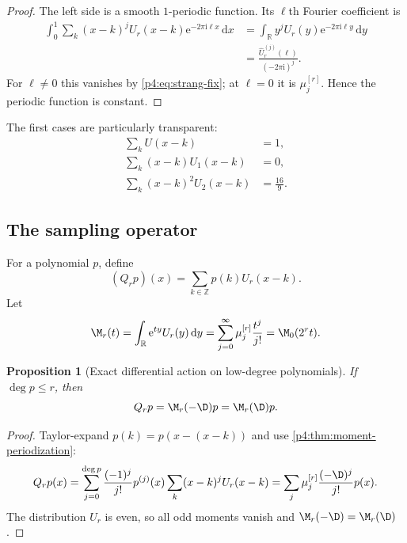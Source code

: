 \documentclass[11pt]{article}
\numberwithin{equation}{section}
\newtheorem{proposition}[theorem]{Proposition}
\theoremstyle{definition}
\theoremstyle{remark}
\newcommand{\R}{\mathbb R}
\newcommand{\Z}{\mathbb Z}
\newcommand{\dd}{\,\mathrm d}
\newcommand{\e}{\mathrm e}
\newcommand{\ii}{\mathrm i}
\begin{document}
\begin{proof}
The left side is a smooth $1$-periodic function.  Its $\ell$th Fourier coefficient is
\begin{align*}
 \int_0^1\sum_k(x-k)^jU_r(x-k)\e^{-2\pi\ii\ell x}\dd x
 &=\int_{\R}y^jU_r(y)\e^{-2\pi\ii\ell y}\dd y\\
 &=\frac{\widehat U_r^{(j)}(\ell)}{(-2\pi\ii)^j}.
\end{align*}
For $\ell\ne0$ this vanishes by \eqref{p4:eq:strang-fix}; at $\ell=0$ it is $\mu_j^{[r]}$.  Hence the periodic function is constant.
\end{proof}

The first cases are particularly transparent:
\begin{align}
 \sum_kU(x-k)&=1,
 \label{p4:eq:partition-unity}\\
 \sum_k(x-k)U_1(x-k)&=0,
 \label{p4:eq:first-moment-periodization}\\
 \sum_k(x-k)^2U_2(x-k)&=\frac{16}{9}.
 \label{p4:eq:second-moment-periodization}
\end{align}

\subsection{The sampling operator}
For a polynomial $p$, define
\begin{equation}
 (Q_rp)(x)=\sum_{k\in\Z}p(k)U_r(x-k).
 \label{p4:eq:sampling-operator}
\end{equation}
Let
\begin{equation}
 \M_r(t)=\int_{\R}\e^{ty}U_r(y)\dd y
 =\sum_{j=0}^{\infty}\mu_j^{[r]}\frac{t^j}{j!}
 =\M_0(2^rt).
 \label{p4:eq:Mr}
\end{equation}

\begin{proposition}[Exact differential action on low-degree polynomials]
\label{p4:prop:Qr-action}
If $\deg p\le r$, then
\begin{equation}
 Q_rp=\M_r(-\D)p=\M_r(\D)p.
 \label{p4:eq:Qr-action}
\end{equation}
\end{proposition}

\begin{proof}
Taylor-expand $p(k)=p(x-(x-k))$ and use \cref{p4:thm:moment-periodization}:
\[
 Q_rp(x)=\sum_{j=0}^{\deg p}\frac{(-1)^j}{j!}p^{(j)}(x)
 \sum_k(x-k)^jU_r(x-k)
 =\sum_j\mu_j^{[r]}\frac{(-\D)^j}{j!}p(x).
\]
The distribution $U_r$ is even, so all odd moments vanish and $\M_r(-\D)=\M_r(\D)$.
\end{proof}
\end{document}
